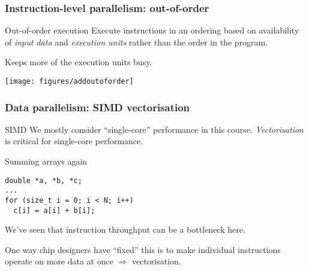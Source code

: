 \documentclass[presentation,aspectratio=43,10pt]{beamer}
\begin{document}
\begin{frame}
  \frametitle{Instruction-level parallelism: out-of-order}
  \begin{block}{Out-of-order execution}
    Execute instructions in an ordering based on availability of \emph{input
      data} and \emph{execution units} rather than the order in the program.
    
    Keeps more of the execution units busy.
  \end{block}

  \begin{center}
    \texttt{[image: figures/addoutoforder]}
  \end{center}
\end{frame}

\begin{frame}[fragile]
  \frametitle{Data parallelism: SIMD vectorisation}
  \begin{block}{SIMD}
    We mostly consider ``single-core'' performance in this course. \emph{Vectorisation} is critical for single-core performance.
  \end{block}

  \begin{exampleblock}{Summing arrays again}
\begin{verbatim}
double *a, *b, *c;
...
for (size_t i = 0; i < N; i++)
  c[i] = a[i] + b[i];
\end{verbatim}

    We've seen that instruction throughput can be a bottleneck here.

    One way chip designers have ``fixed'' this is to make individual
    instructions operate on more data at once $\Rightarrow$ vectorisation.
  \end{exampleblock}
\end{frame}
\end{document}
